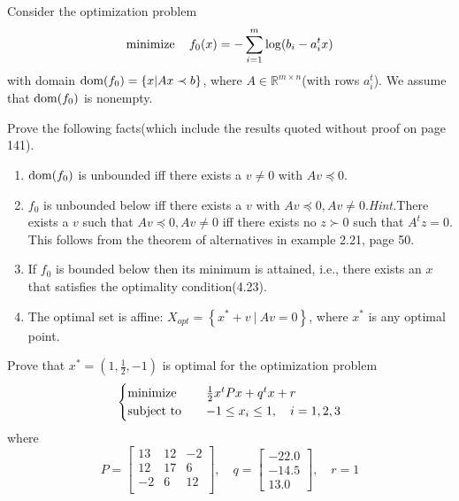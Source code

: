 \begin{problem}[4.2]
    Consider the optimization problem\[\operatorname{minimize} \quad f_0(x) = -\sum_{i = 1}^m\log(b_i - a_i^tx)\] with domain $\operatorname{dom}(f_0) = \left\{x | Ax \prec b\right\}$, where $A \in \mathbb{R}^{m \times n}$(with rows $a_i^t$). We assume that $\operatorname{dom}(f_0)$ is nonempty.

    Prove the following facts(which include the results quoted without proof on page 141).
    \begin{enumerate}
        \item $\operatorname{dom}(f_0)$ is unbounded iff there exists a $v \neq 0$ with $Av \preceq 0$.
        \item $f_0$ is unbounded below iff there exists a $v$ with $Av \preceq 0, Av \neq 0$.\textit{Hint.}There exists a $v$ such that $Av \preceq 0, Av \neq 0$ iff there exists no $z \succ 0$ such that $A^tz = 0$. This follows from the theorem of alternatives in example 2.21, page 50.
        \item If $f_0$ is bounded below then its minimum is attained, i.e., there exists an $x$ that satisfies the optimality condition(4.23).
        \item The optimal set is affine: $X_{opt} = \left\{x^* + v\ |\ Av = 0\right\}$, where $x^*$ is any optimal point.
    \end{enumerate}
\end{problem}

\begin{problem}[4.3]
    Prove that $x^* = \left(1, \frac{1}{2}, -1\right)$ is optimal for the optimization problem\[\begin{cases}
        \operatorname{minimize} \quad &\frac{1}{2}x^tPx + q^tx + r\\
        \operatorname{subject\ to} \quad & -1 \le x_i \le 1, \quad i = 1, 2, 3
    \end{cases}\] where \[P = \begin{bmatrix}
        13 & 12 & -2\\
        12 & 17 & 6\\
        -2 & 6 & 12\\
    \end{bmatrix}, \quad q = \begin{bmatrix}
        -22.0 \\ -14.5 \\ 13.0
    \end{bmatrix}, \quad r = 1\]
\end{problem}

